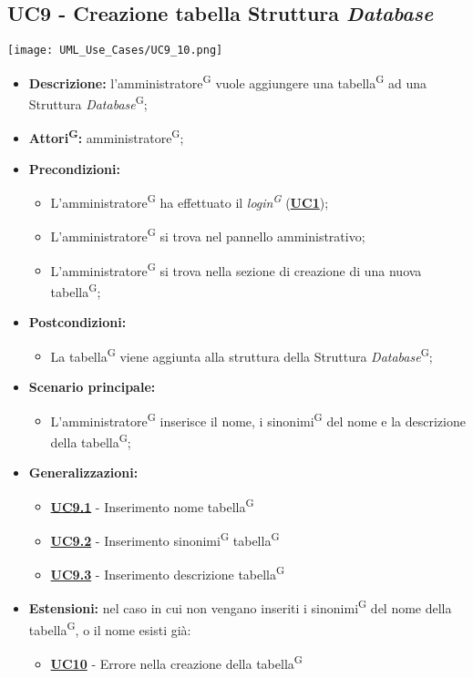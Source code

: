 \subsection{UC9 - Creazione tabella Struttura \textit{Database}}
\label{sec:UC9}
\texttt{[image: UML\_Use\_Cases/UC9\_10.png]}
\begin{itemize}
	\item \textbf{Descrizione:} l’amministratore\textsuperscript{G} vuole aggiungere una tabella\textsuperscript{G} ad una Struttura \textit{Database}\textsuperscript{G};
	\item \textbf{Attori\textsuperscript{G}:} amministratore\textsuperscript{G};
	\item \textbf{Precondizioni:} 
	\begin{itemize}
		\item L’amministratore\textsuperscript{G} ha effettuato il \textit{login\textsuperscript{G}} (\hyperref[sec:UC1]{\textbf{UC1}});
		\item L’amministratore\textsuperscript{G} si trova nel pannello amministrativo;
		\item L’amministratore\textsuperscript{G} si trova nella sezione di creazione di una nuova tabella\textsuperscript{G};
	\end{itemize}
	\item \textbf{Postcondizioni:} 
	\begin{itemize}
		\item La tabella\textsuperscript{G} viene aggiunta alla struttura della Struttura \textit{Database}\textsuperscript{G};
	\end{itemize}
	\item \textbf{Scenario principale:} 
	\begin{itemize}
		\item L’amministratore\textsuperscript{G} inserisce il nome, i sinonimi\textsuperscript{G} del nome e la descrizione della tabella\textsuperscript{G};
	\end{itemize}
	\item \textbf{Generalizzazioni:} 
	\begin{itemize}
		\item \hyperref[sec:UC9.1]{\textbf{UC9.1}} - Inserimento nome tabella\textsuperscript{G}
		\item \hyperref[sec:UC9.2]{\textbf{UC9.2}} - Inserimento sinonimi\textsuperscript{G} tabella\textsuperscript{G}
		\item \hyperref[sec:UC9.3]{\textbf{UC9.3}} - Inserimento descrizione tabella\textsuperscript{G}
	\end{itemize}
	\item \textbf{Estensioni:} nel caso in cui non vengano inseriti i sinonimi\textsuperscript{G} del nome della tabella\textsuperscript{G}, o il nome esisti già:
	\begin{itemize}
		\item \hyperref[sec:UC10]{\textbf{UC10}} - Errore nella creazione della tabella\textsuperscript{G}
	\end{itemize}
\end{itemize}

